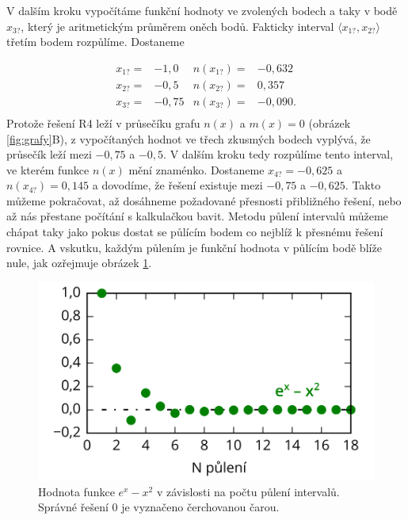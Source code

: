 \documentclass[a4paper,oneside,12pt]{article}
\begin{document}
V dalším kroku vypočítáme funkční hodnoty ve zvolených bodech
a taky v bodě $x_{3?}$, který je aritmetickým průměrem oněch bodů.
Fakticky interval $\langle x_{1?}, x_{2?} \rangle$
třetím bodem rozpůlíme. Dostaneme

\begin{align*}
x_{1?} = {} & -1,0  &  n(x_{1?}) = {} & -0,632 \\
x_{2?} = {} & -0,5  &  n(x_{2?}) = {} & 0,357 \\
x_{3?} = {} & -0,75 &  n(x_{3?}) = {} & -0,090. \\
\end{align*}
%
Protože řešení R4 leží v průsečíku grafu $n(x)$ a $m(x)=0$ 
(obrázek \ref{fig:grafy}B), z vypočítaných hodnot 
ve třech zkusmých bodech 
vyplývá, že průsečík leží mezi $-0,75$ a $-0,5$. 
V dalším kroku tedy rozpůlíme tento interval, ve 
kterém funkce $n(x)$ mění znaménko. Dostaneme 
$x_{4?} = -0,625$ a $n(x_{4?}) = 0,145$ a dovodíme, že 
řešení existuje mezi $-0,75$ a $-0,625$. Takto můžeme 
pokračovat, až dosáhneme požadované přesnosti přibližného 
řešení, nebo až nás přestane počítání s kalkulačkou bavit.
Metodu půlení intervalů můžeme chápat taky jako pokus
dostat se půlícím bodem co nejblíž k přesnému řešení rovnice.
A vskutku, každým půlením je funkční hodnota v půlícím bodě blíže
nule, jak ozřejmuje obrázek \ref{fig:puleni}.

\begin{figure}
\begin{center}
\includegraphics{./IMGS/puleni-drawing.png}
\end{center}
\caption{Hodnota funkce $e^x - x^2$ v závislosti na počtu půlení
intervalů. Správné řešení 0 je vyznačeno čerchovanou čarou.}
\label{fig:puleni}
\end{figure}
\end{document}
